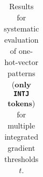 \begin{table}[t]
\begin{tabular}{lllllll}

\\ \hline
\end{tabular}
\caption[Model Evaluation for only \texttt{INTJ} tokens]{Results for systematic evaluation of one-hot-vector patterns (\textbf{only \texttt{INTJ} tokens}) for multiple integrated gradient thresholds $t$.}
\label{tab:evalResultsINTJ}
\end{table}
	
